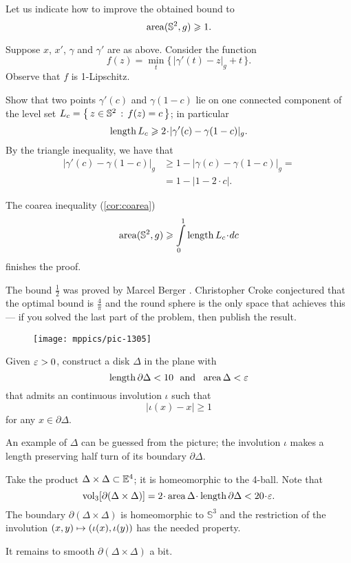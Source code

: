 Let us indicate how to improve the obtained bound to
\[\operatorname{\rm area}\nolimits(\mathbb{S}^2,g)\geqslant1.\]

Suppose $x$, $x'$, $\gamma$ and $\gamma'$ are as above.
Consider the function
\[f(z)=\min_t \{\,|\gamma'(t)-z|_g+t\,\}.\]
Observe that $f$ is 1-Lipschitz.

Show that two points $\gamma'(c)$ and $\gamma(1-c)$ lie on one connected component of the level set $L_c=\left\{\,{z\in\mathbb{S}^2}\,:\,{f(z)=c}\,\right\}$;
in particular 
\[\length L_c\ge 2\cdot|\gamma'(c)-\gamma(1-c)|_g.\]
By the triangle inequality, we have that
\begin{align*}
|\gamma'(c)-\gamma(1-c)|_g&\ge 1-|\gamma(c)-\gamma(1-c)|_g=
\\
&=1-|1-2\cdot c|.
\end{align*}

The coarea inequality (\ref{cor:coarea})
\[\area(\mathbb{S}^2,g)\ge \int\limits_0^1\length L_c\cdot dc\]
finishes the proof.


The bound $\tfrac12$ was proved by Marcel Berger \cite{berger}. 
Christopher Croke conjectured that the optimal bound is $\tfrac4\pi$ and the round sphere is the only space that achieves this \cite[Conjecture 0.3 in][]{croke} --- if you solved the last part of the problem, then publish the result.

\begin{wrapfigure}{r}{20 mm}
\vskip-0mm
\centering
\texttt{[image: mppics/pic-1305]}
\end{wrapfigure}

Given $\varepsilon>0$, construct a disk $\Delta$ in the plane with 
\[\mathop{\rm length}\nolimits\partial \Delta<10\ \ \text{and}\ \ \operatorname{\rm area}\nolimits \Delta<\varepsilon\]
that admits an continuous involution $\iota$ such that 
\[|\iota(x)-x|\ge 1\]
for any $x\in\partial \Delta$.

An example of $\Delta$ can be guessed from the picture;
the involution $\iota$ makes a length preserving half turn of its boundary $\partial \Delta$.


Take the product $\Delta\times \Delta\subset \mathbb{E}^4$;
it is homeomorphic to the 4-ball.
Note that 
$$\vol_3[\partial(\Delta\times \Delta)]=2\cdot\area \Delta\cdot\length \partial \Delta<20\cdot\eps.$$
The boundary $\partial(\Delta\times \Delta)$ is homeomorphic to $\mathbb{S}^3$
and the restriction of the involution $(x,y)\z\mapsto (\iota(x),\iota(y))$ has the needed property.

It remains to smooth $\partial(\Delta\times \Delta)$ a  bit.

